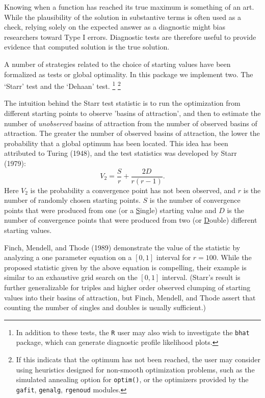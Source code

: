 \documentclass[11pt]{article}
\begin{document}
Knowing when a function has reached its true maximum is
something of an art. While the plausibility of the solution
in substantive terms is often used as a check, relying solely on the expected
answer as a diagnostic might bias researchers toward Type I errors. Diagnostic
tests are therefore useful to provide evidence that computed
solution is the true solution.

A number of strategies related to the choice of   starting values
 have been formalized as tests or global optimality. In this package we 
 implement two. The `Starr' test and the `Dehaan' test.
\footnote{In addition to these tests, the \texttt{R} user may also wish to investigate
the \texttt{bhat} package, which can generate diagnostic profile likelihood plots.} 
\footnote{If this indicats that the optimum has not been reached, the user may consider
using  heuristics designed for non-smooth optimization problems, such as the simulated annealing option for \texttt{optim()}, or the optimizers provided by  the \texttt{gafit}, \texttt{genalg}, 
\texttt{rgenoud} modules.}
 
The intuition behind the Starr test statistic is to run the optimization from 
different starting points to observe 'basins of attraction', and then to
estimate the number of \emph{unobserved} basins of attraction from the
number of observed basins of attraction.  The greater the number
of observed basins of attraction, the lower the probability that a
global optimum has been located.  This idea has been attributed to Turing (1948),
and the test statistics was developed  by Starr (1979):
\begin{equation}\label{Starr.test.equation}
    V_{2}=\frac{S}{r}+\frac{2D}{r\left( r-1\right)}.
\end{equation} Here $V_2$ is the probability a convergence
point has not been observed, and $r$ is the number of randomly
chosen starting points. $S$ is the number of convergence points
that were produced from one (or a {\underline{S}}ingle) starting
value and $D$ is the number of convergence points that were
produced from two (or {\underline{D}}ouble) different starting
values. 

Finch, Mendell, and Thode (1989) demonstrate the value of the
statistic by analyzing a one parameter equation on a $[0,1]$
interval for $r = 100$. While the proposed statistic given by the
above equation is compelling, their example is similar to an
exhaustive grid search on the $[0,1]$ interval. 
(Starr's result is further generalizable for triples and
higher order observed clumping of starting values into their
basins of attraction, but Finch, Mendell, and Thode assert that
counting the number of singles and doubles is usually sufficient.)
\end{document}
